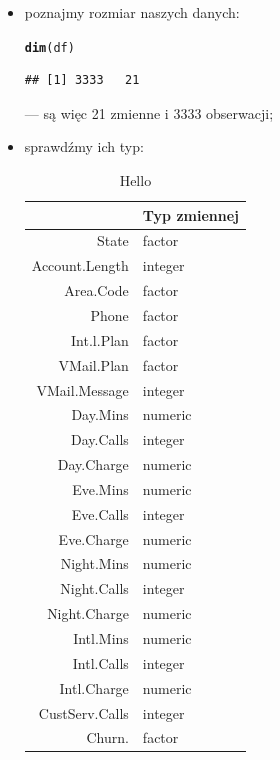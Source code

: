 \documentclass{article}\usepackage[]{graphicx}\usepackage[]{color}
\makeatletter
\newcommand{\hlstd}[1]{\textcolor[rgb]{0.345,0.345,0.345}{#1}}%
\newcommand{\hlkwd}[1]{\textcolor[rgb]{0.737,0.353,0.396}{\textbf{#1}}}%
\newenvironment{kframe}{%
 \def\at@end@of@kframe{}%
 \ifinner\ifhmode%
  \def\at@end@of@kframe{\end{minipage}}%
  \begin{minipage}{\columnwidth}%
 \fi\fi%
 \def\FrameCommand##1{\hskip\@totalleftmargin \hskip-\fboxsep
 \colorbox{shadecolor}{##1}\hskip-\fboxsep
     \hskip-\linewidth \hskip-\@totalleftmargin \hskip\columnwidth}%
 \MakeFramed {\advance\hsize-\width
   \@totalleftmargin\z@ \linewidth\hsize
   \@setminipage}}%
 {\par\unskip\endMakeFramed%
 \at@end@of@kframe}
\newenvironment{knitrout}{}{} %
\makeatother
\begin{document}
\begin{itemize}

\item poznajmy rozmiar naszych danych:
\begin{knitrout}
\color{fgcolor}\begin{kframe}
\begin{alltt}
\hlkwd{dim}\hlstd{(df)}
\end{alltt}
\begin{verbatim}
## [1] 3333   21
\end{verbatim}
\end{kframe}
\end{knitrout}
--- są więc 21 zmienne i 3333 obserwacji;

\item sprawdźmy ich typ:
\begin{table}[H]
\centering
\begin{tabular}{rl}
  \hline
 & Typ zmiennej \\ 
  \hline
State & factor \\ 
  Account.Length & integer \\ 
  Area.Code & factor \\ 
  Phone & factor \\ 
  Int.l.Plan & factor \\ 
  VMail.Plan & factor \\ 
  VMail.Message & integer \\ 
  Day.Mins & numeric \\ 
  Day.Calls & integer \\ 
  Day.Charge & numeric \\ 
  Eve.Mins & numeric \\ 
  Eve.Calls & integer \\ 
  Eve.Charge & numeric \\ 
  Night.Mins & numeric \\ 
  Night.Calls & integer \\ 
  Night.Charge & numeric \\ 
  Intl.Mins & numeric \\ 
  Intl.Calls & integer \\ 
  Intl.Charge & numeric \\ 
  CustServ.Calls & integer \\ 
  Churn. & factor \\ 
   \hline
\end{tabular}
\caption{Hello} 
\label{tab:tabela1}
\end{table}


\end{itemize}
\end{document}
